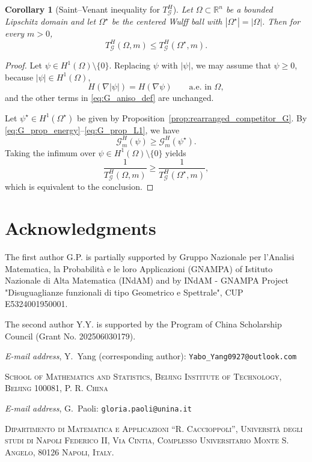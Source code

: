 \documentclass[oneside,a4paper,12pt,notitlepage]{article}
\makeatletter
\newtheorem{corollary}[theorem]{Corollary}
\theoremstyle{definition}
\newcommand{\R}{\mathbb{R}}
\newcommand{\Addresses}{{
\bigskip 
  \footnotesize 
  \textit{E-mail address}, Y.~Yang (corresponding author): \texttt{Yabo\_Yang0927@outlook.com} 
  
   \medskip 

\textsc{School of Mathematics and Statistics, Beijing Institute of Technology, Beijing 100081, P. R. China}
   
     \textit{E-mail address}, G.~Paoli: \texttt{gloria.paoli@unina.it} 
   \medskip 
   
 \textsc{Dipartimento di Matematica e Applicazioni ``R. Caccioppoli'', Universit\`a degli studi di Napoli Federico II, Via Cintia, Complesso Universitario Monte S. Angelo, 80126 Napoli, Italy.}
 
 
 \par\nopagebreak 

}}
\makeatother
\begin{document}
\begin{corollary}[Saint--Venant inequality for $T_{\mathcal G}^H$]
\label{cor:SV_TG_aniso}
Let $\Omega\subset\R^n$ be a bounded Lipschitz domain and let $\Omega^\star$ be the
centered Wulff ball with $|\Omega^\star|=|\Omega|$. Then for every $m>0$,
\[
T_{\mathcal G}^H(\Omega,m)\le T_{\mathcal G}^H(\Omega^\star,m).
\]
\end{corollary}

\begin{proof}
Let $\psi\in H^1(\Omega)\setminus\{0\}$. Replacing $\psi$ with $|\psi|$, we may assume
that $\psi\ge 0$, because $|\psi|\in H^1(\Omega)$,
\[
H(\nabla|\psi|)=H(\nabla\psi)\qquad\text{a.e. in }\Omega,
\]
and the other terms in \eqref{eq:G_aniso_def} are unchanged.

Let $\psi^\star\in H^1(\Omega^\star)$ be given by
Proposition~\ref{prop:rearranged_competitor_G}. By
\eqref{eq:G_prop_energy}--\eqref{eq:G_prop_L1}, we have
\[
\mathcal G_m^H(\psi)\ge \mathcal G_m^H(\psi^\star).
\]
Taking the infimum over $\psi\in H^1(\Omega)\setminus\{0\}$ yields
\[
\frac1{T_{\mathcal G}^H(\Omega,m)}
\ge
\frac1{T_{\mathcal G}^H(\Omega^\star,m)},
\]
which is equivalent to the conclusion.
\end{proof}



\section*{Acknowledgments}
The first author G.P. is partially supported by Gruppo Nazionale per l’Analisi Matematica, la Probabilità e le loro Applicazioni
(GNAMPA) of Istituto Nazionale di Alta Matematica (INdAM) and  by INdAM - GNAMPA Project "Disuguaglianze funzionali di tipo Geometrico e Spettrale", CUP E5324001950001. 


 The second author Y.Y. is supported by the Program of China Scholarship Council (Grant No. 202506030179).





\Addresses
\end{document}
